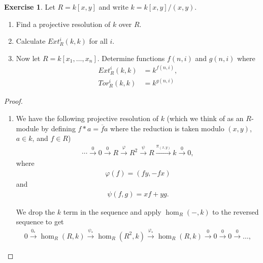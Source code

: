 \documentclass[12pt]{extarticle}
\newcommand{\<}{\langle}
\renewcommand{\>}{\rangle}
\theoremstyle{definition}
\newtheorem{exercise}{Exercise}
\begin{document}
\begin{exercise}
  Let $R=k[x,y]$ and write $k = k[x,y]/(x,y)$.
  \begin{enumerate}
  \item
    Find a projective resolution of $k$ over $R$.
  \item
    Calculate $Ext_{R}^i(k,k)$ for all $i$.
  \item
    Now let $R=k[x_1, \dots, x_n]$. Determine  functions $f(n,i)$ and $g(n,i)$ where
    \begin{align*}
      Ext_R^i(k,k) &= k^{f(n,i)}, \\
      Tor_R^{i}(k,k) &= k^{g(n,i)}
    \end{align*}
  \end{enumerate}
\end{exercise}
\begin{proof}
  \begin{enumerate}
  \item
    We have the following projective resolution of $k$ (which we think of as an $R$-module by defining $f * a = \overline{f}a$ where the reduction is taken modulo $(x,y)$, $a \in k$, and $f \in R$)
    \begin{align*}
      \cdots \xrightarrow{0} 0 \xrightarrow{0} R \xrightarrow{\varphi} R^2 \xrightarrow{\psi} R \xrightarrow{\pi_{(x,y)}} k \xrightarrow{0} 0,
    \end{align*}
    where
    \begin{align*}
      \varphi(f) = (fy,-fx)
    \end{align*}
    and
    \begin{align*}
      \psi(f,g) = xf + yg.
    \end{align*}

    We drop the $k$ term in the sequence and apply $\hom_R(-, k)$ to the reversed sequence to get
    \begin{align*}
      0 \xrightarrow{0_*} \hom_R(R,k) \xrightarrow{\psi_*} \hom_R(R^2,k) \xrightarrow{\varphi_*} \hom_R(R,k) \xrightarrow{0} 0 \xrightarrow{0} 0 \xrightarrow{0} \dots,
    \end{align*}


\end{enumerate}
\end{proof}
\end{document}

